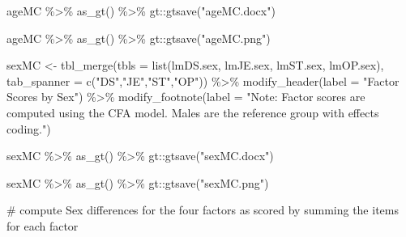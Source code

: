 \documentclass[
  letterpaper,
  DIV=11,
  numbers=noendperiod]{scrartcl}
\newenvironment{Shaded}{\begin{snugshade}}{\end{snugshade}}
\newcommand{\AttributeTok}[1]{\textcolor[rgb]{0.40,0.45,0.13}{#1}}
\newcommand{\CommentTok}[1]{\textcolor[rgb]{0.37,0.37,0.37}{#1}}
\newcommand{\FunctionTok}[1]{\textcolor[rgb]{0.28,0.35,0.67}{#1}}
\newcommand{\NormalTok}[1]{\textcolor[rgb]{0.00,0.23,0.31}{#1}}
\newcommand{\OtherTok}[1]{\textcolor[rgb]{0.00,0.23,0.31}{#1}}
\newcommand{\SpecialCharTok}[1]{\textcolor[rgb]{0.37,0.37,0.37}{#1}}
\newcommand{\StringTok}[1]{\textcolor[rgb]{0.13,0.47,0.30}{#1}}
\begin{document}
\begin{Shaded}
\begin{Highlighting}[]
\NormalTok{ageMC }\SpecialCharTok{\%\textgreater{}\%}
  \FunctionTok{as\_gt}\NormalTok{() }\SpecialCharTok{\%\textgreater{}\%}
\NormalTok{  gt}\SpecialCharTok{::}\FunctionTok{gtsave}\NormalTok{(}\StringTok{"ageMC.docx"}\NormalTok{)}

\NormalTok{ageMC }\SpecialCharTok{\%\textgreater{}\%}
  \FunctionTok{as\_gt}\NormalTok{() }\SpecialCharTok{\%\textgreater{}\%}
\NormalTok{  gt}\SpecialCharTok{::}\FunctionTok{gtsave}\NormalTok{(}\StringTok{"ageMC.png"}\NormalTok{)}

\NormalTok{sexMC }\OtherTok{\textless{}{-}} \FunctionTok{tbl\_merge}\NormalTok{(}\AttributeTok{tbls =} \FunctionTok{list}\NormalTok{(lmDS.sex, lmJE.sex, lmST.sex, lmOP.sex),}
          \AttributeTok{tab\_spanner =} \FunctionTok{c}\NormalTok{(}\StringTok{"DS"}\NormalTok{,}\StringTok{"JE"}\NormalTok{,}\StringTok{"ST"}\NormalTok{,}\StringTok{"OP"}\NormalTok{)) }\SpecialCharTok{\%\textgreater{}\%}
  \FunctionTok{modify\_header}\NormalTok{(}\AttributeTok{label =} \StringTok{"Factor Scores by Sex"}\NormalTok{) }\SpecialCharTok{\%\textgreater{}\%}
  \FunctionTok{modify\_footnote}\NormalTok{(}\AttributeTok{label =} \StringTok{"Note: Factor scores are computed using the CFA model.  Males are the reference group with effects coding."}\NormalTok{)}

\NormalTok{sexMC }\SpecialCharTok{\%\textgreater{}\%}
  \FunctionTok{as\_gt}\NormalTok{() }\SpecialCharTok{\%\textgreater{}\%}
\NormalTok{  gt}\SpecialCharTok{::}\FunctionTok{gtsave}\NormalTok{(}\StringTok{"sexMC.docx"}\NormalTok{)}

\NormalTok{sexMC }\SpecialCharTok{\%\textgreater{}\%}
  \FunctionTok{as\_gt}\NormalTok{() }\SpecialCharTok{\%\textgreater{}\%}
\NormalTok{  gt}\SpecialCharTok{::}\FunctionTok{gtsave}\NormalTok{(}\StringTok{"sexMC.png"}\NormalTok{)}

\CommentTok{\# compute Sex differences for the four factors as scored by summing the items for each factor}


\end{Highlighting}
\end{Shaded}
\end{document}
